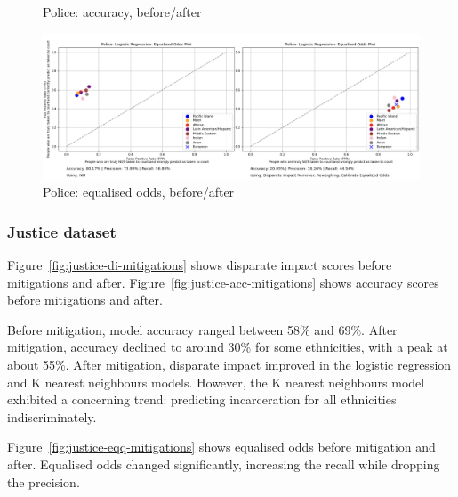 \documentclass[runningheads]{llncs}
\begin{document}
\begin{figure}
\begin{minipage}{0.47\textwidth}
        \caption{Police: accuracy, before/after}
        \label{fig:police-acc-mitigation}
    \end{minipage}
\end{figure}

\begin{figure}
    \centering
    \includegraphics[width=\textwidth]{../tex/police_eqq}
    \caption{Police: equalised odds, before/after}
    \label{fig:police-eqq-mitigations}
\end{figure}

\subsubsection{Justice dataset}
Figure~\ref{fig:justice-di-mitigations} shows disparate impact scores
before mitigations and after.
Figure~\ref{fig:justice-acc-mitigations} shows accuracy scores before
mitigations and after.

Before mitigation, model accuracy ranged between 58\% and 69\%.
After mitigation, accuracy declined to around 30\% for some
ethnicities, with a peak at about 55\%.
After mitigation, disparate impact improved in the logistic regression
and K nearest neighbours models. However, the K nearest neighbours model
exhibited a concerning trend: predicting incarceration for all
ethnicities indiscriminately.

Figure~\ref{fig:justice-eqq-mitigations} shows equalised odds before
mitigation and after. Equalised odds changed significantly, increasing
the recall while dropping the precision.
\end{document}
